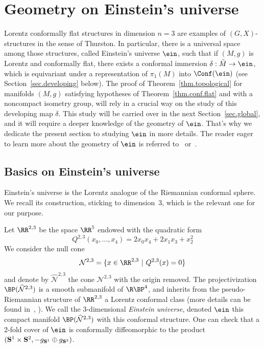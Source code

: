 \section{Geometry on Einstein's universe}\label{sec.geomeinstein}

Lorentz conformally flat structures in dimension $n=3$ are examples of $(G,X)$-structures in the sense of Thurston. In particular, there is a universal space among those structures, called Einstein's universe $\ein$, such that if $(M,g)$ is Lorentz and conformally flat, there exists a conformal immersion $\delta: \tilde{M} \to \ein$, which is equivariant under a representation of $\pi_1(M)$ into $\Conf(\ein)$ (see Section~\ref{sec.developing} below). The proof of Theorem~\ref{thm.topological} for manifolds $(M,g)$ satisfying hypotheses of Theorem~\ref{thm.conf.flat} and with a noncompact isometry group, will rely in a crucial way on the study of this developing map $\delta$. This study will be carried over in the next Section~\ref{sec.global}, and it will require a deeper knowledge of the geometry of $\ein$. That's why we dedicate the present section to studying $\ein$ in more details. The reader eager to learn more about the geometry of $\ein$ is referred to~\cite{charlesthese} or~\cite{primer}.


\subsection{Basics on Einstein's universe}\label{sec.description.einstein}
Einstein's universe is the Lorentz analogue of the Riemannian conformal sphere. We recall its construction, sticking to dimension~$3$, which is the relevant one for our purpose.

Let $\RR^{2,3}$ be the space $\RR^{5}$ endowed with the quadratic form
\[
Q^{2,3}(x_0, \ldots, x_{4}) = 2x_0x_{4} + 2x_{1}x_{3} + x_2^2
\]
We consider the null cone
\[
\mathcal{N}^{2,3} = \{ x \in \RR^{2,3} \ | \ Q^{2,3}(x)=0 \}
\]
and denote by $\mathcal{\widehat{N}}^{2,3}$ the cone $\mathcal{N}^{2,3}$ with the origin removed. The projectivization ${\BP}(\widehat{\mathcal{N}}^{2,3})$ is a smooth submanifold of $\R\BP^{4}$, and inherits from the pseudo-Riemannian structure of $\RR^{2,3}$ a Lorentz conformal class (more details can be found in~\cite{charlesthese}, \cite{primer}). We call the $3$-dimensional \emph{Einstein universe}, denoted $\ein$ this compact manifold ${\BP}(\widehat{\mathcal{N}}^{2,3})$ with this conformal structure. One can check that a $2$-fold cover of $\ein$ is conformally diffeomorphic to the product $({\bf S}^1 \times {\bf S}^{2},-g_{{\bf S}^1} \oplus g_{{\bf S}^2})$.

